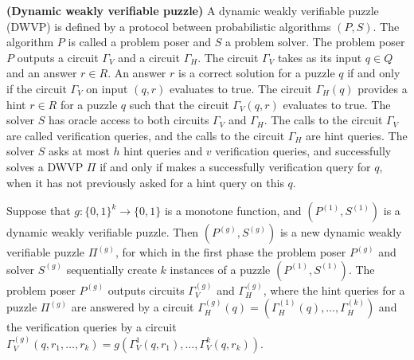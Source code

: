 \begin{definition} {\textbf{(Dynamic weakly verifiable puzzle)}}
  A dynamic weakly verifiable puzzle (DWVP) is defined by a protocol between probabilistic algorithms $(P,S)$.
  The algorithm $P$ is called a problem poser and $S$ a problem solver.
  The problem poser $P$ outputs a circuit $\Gamma_{V}$ and a circuit $\Gamma_{H}$.
  The circuit $\Gamma_{V}$ takes as its input $q \in Q$ and an answer $r \in R$.
  An answer $r$ is a correct solution for a puzzle $q$ if and only if the circuit $\Gamma_V$ on input $(q,r)$ evaluates to true.
  The circuit $\Gamma_H(q)$ provides a hint $r \in R$ for a puzzle $q$ such that the circuit $\Gamma_V(q,r)$ evaluates to true.
  The solver $S$ has oracle access to both circuits $\Gamma_V$ and $\Gamma_H$.
  The calls to the circuit $\Gamma_V$ are called verification queries, and the calls to the circuit $\Gamma_H$ are hint queries.
  The solver $S$ asks at most $h$ hint queries and $v$ verification queries, and successfully solves a DWVP $\Pi$ if and only if
  makes a successfully verification query for $q$, when it has not previously asked for a hint query on this $q$.
\end{definition}
%
%
%
Suppose that $g: \{0,1\}^k \rightarrow \{0,1\}$ is a monotone function, and $\left( P^{(1)}, S^{(1)} \right)$ is a dynamic weakly verifiable puzzle.
Then $(P^{(g)}, S^{(g)})$ is a new dynamic weakly verifiable puzzle $\Pi^{(g)}$, for which in the first phase the problem poser $P^{(g)}$ and solver $S^{(g)}$ sequentially create $k$ instances of
a puzzle $\left( P^{(1)}, S^{(1)}\right)$. The problem poser $P^{(g)}$ outputs circuits $\Gamma_V^{(g)}$ and $\Gamma_H^{(g)}$,
where the hint queries for a puzzle $\Pi^{(g)}$ are answered by a circuit $\Gamma_H^{(g)}(q) = \left( \Gamma_H^{(1)}(q), \dots, \Gamma_H^{(k)} \right)$
and the verification queries by a circuit $\Gamma_V^{(g)}(q, r_1, \dots, r_k) = g \left( \Gamma_V^{1}(q, r_1), \dots, \Gamma_V^{k}(q, r_k) \right)$.

